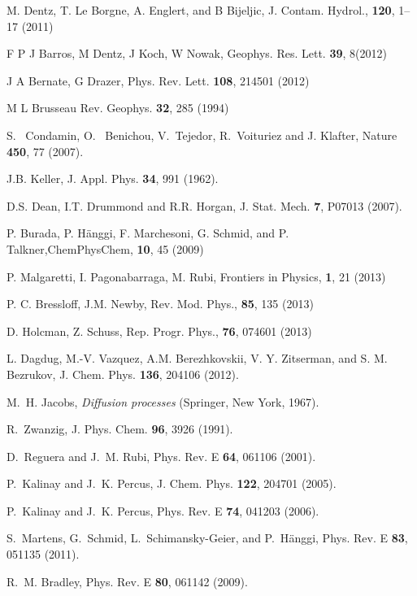 \documentclass[pre,showpacs,preprintnumbers,amsmath,amssymb,superscriptaddress]{revtex4-1}
\begin{document}
{{\begin{thebibliography}{10}
 M. Dentz, T. Le Borgne, A. Englert,  and B Bijeljic, J. Contam. Hydrol., {\bf 120}, 1--17 (2011)

F P J Barros, M Dentz, J Koch,  W Nowak, Geophys. Res. Lett. {\bf39}, 8(2012)

J A  Bernate, G Drazer, Phys. Rev. Lett. {\bf 108}, 214501 (2012)

 M L Brusseau
Rev. Geophys. {\bf 32}, 285 (1994)



 S.~ Condamin, O.~ Benichou, V.~Tejedor, R.~Voituriez and J. Klafter, Nature {\bf 450}, 77 (2007).

 J.B. Keller, J. Appl. Phys. {\bf 34}, 991 (1962).

 D.S. Dean, I.T. Drummond and R.R. Horgan, J. Stat. Mech. {\bf 7}, P07013 (2007).

 P. Burada, P. H{\"a}nggi, F.  Marchesoni, G.	Schmid, and P. Talkner,ChemPhysChem, { \bf 10}, 45 (2009)

 P. Malgaretti, I. Pagonabarraga, M. Rubi, Frontiers in Physics, {\bf 1}, 21 (2013)

 P. C. Bressloff, J.M. Newby, Rev. Mod. Phys.,  {\bf 85}, 135 (2013)

 D. Holcman, Z. Schuss,   
Rep. Progr. Phys., {\bf 76}, 074601 (2013)


 L. Dagdug, M.-V. Vazquez, A.M. Berezhkovskii, V. Y. Zitserman, and S. M. Bezrukov, J. Chem. Phys. {\bf 136}, 204106 (2012).

 M.~H. Jacobs, {\it Diffusion processes} (Springer, New York, 1967).

 R.~Zwanzig, J. Phys. Chem. {\bf 96}, 3926 (1991).

 D.~Reguera and J.~M. Rubi, Phys. Rev. E {\bf 64}, 061106 (2001).

 P.~Kalinay and J.~K. Percus, J. Chem. Phys. {\bf 122}, 204701 (2005).

 P.~Kalinay and J.~K. Percus, Phys. Rev. E {\bf 74}, 041203 (2006).

 S.~Martens, G.~Schmid, L.~Schimansky-Geier, and P.~H{\"a}nggi, Phys. Rev. E {\bf 83}, 051135 (2011).
 
 R.~M. Bradley, Phys. Rev. E {\bf 80}, 061142 (2009).


\end{thebibliography}}}
\end{document}
